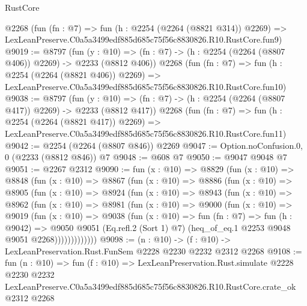 \begin{lexlean}{RustCore}
\begin{coremodule}
    @2268
    (fun (fn : @7) =>
    fun (h : @2254 (@2264 (@8821 @314)) @2269) =>
    LexLeanPreserve.C0a5a3499edf885d685c75f56c8830826.R10.RustCore.fun9)
@9019 := @8797
    (fun (y : @10) => (fn : @7) -> (h : @2254 (@2264 (@8807 @406)) @2269) -> @2233 (@8812 @406))
    @2268
    (fun (fn : @7) =>
    fun (h : @2254 (@2264 (@8821 @406)) @2269) =>
    LexLeanPreserve.C0a5a3499edf885d685c75f56c8830826.R10.RustCore.fun10)
@9038 := @8797
    (fun (y : @10) => (fn : @7) -> (h : @2254 (@2264 (@8807 @417)) @2269) -> @2233 (@8812 @417))
    @2268
    (fun (fn : @7) =>
    fun (h : @2254 (@2264 (@8821 @417)) @2269) =>
    LexLeanPreserve.C0a5a3499edf885d685c75f56c8830826.R10.RustCore.fun11)
@9042 := @2254 (@2264 (@8807 @846)) @2269
@9047 := Option.noConfusion.{0, 0} (@2233 (@8812 @846)) @7
@9048 := @608 @7
@9050 := @9047 @9048 @7
@9051 := @2267 @2312
@9090 := fun (x : @10) =>
  @8829
    (fun (x : @10) =>
    @8848
      (fun (x : @10) =>
      @8867
        (fun (x : @10) =>
        @8886
          (fun (x : @10) =>
          @8905
            (fun (x : @10) =>
            @8924
              (fun (x : @10) =>
              @8943
                (fun (x : @10) =>
                @8962
                  (fun (x : @10) =>
                  @8981
                    (fun (x : @10) =>
                    @9000
                      (fun (x : @10) =>
                      @9019
                        (fun (x : @10) =>
                        @9038
                          (fun (x : @10) =>
                          fun (fn : @7) =>
                          fun (h : @9042) =>
                          @9050
                            @9051
                            (Eq.refl.{2} (Sort 1) @7)
                            (heq_of_eq.{1} @2253 @9048 @9051 @2268)))))))))))))
@9098 := (n : @10) -> (f : @10) -> LexLeanPreservation.Rust.FunSem @2228 @2230 @2232 @2312 @2268
@9108 := fun (n : @10) =>
  fun (f : @10) =>
  LexLeanPreservation.Rust.simulate
    @2228
    @2230
    @2232
    LexLeanPreserve.C0a5a3499edf885d685c75f56c8830826.R10.RustCore.crate_ok
    @2312
    @2268
\end{coremodule}
\end{lexlean}
